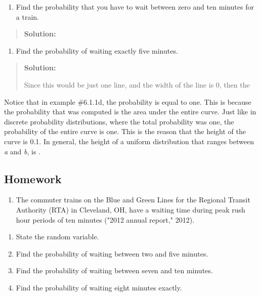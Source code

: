 \documentclass[]{book}
\providecommand{\tightlist}{%
  \setlength{\itemsep}{0pt}\setlength{\parskip}{0pt}}
\begin{document}
\begin{enumerate}
\def\labelenumi{\alph{enumi}.}
\setcounter{enumi}{3}
\tightlist
\item
  Find the probability that you have to wait between zero and ten
  minutes for a train.
\end{enumerate}

\begin{quote}
\textbf{Solution:}
\end{quote}

\begin{enumerate}
\def\labelenumi{\alph{enumi}.}
\setcounter{enumi}{4}
\tightlist
\item
  Find the probability of waiting exactly five minutes.
\end{enumerate}

\begin{quote}
\textbf{Solution:}

Since this would be just one line, and the width of the line is 0,
then the
\end{quote}

Notice that in example \#6.1.1d, the probability is equal to one. This
is because the probability that was computed is the area under the
entire curve. Just like in discrete probability distributions, where the
total probability was one, the probability of the entire curve is one.
This is the reason that the height of the curve is 0.1. In general, the
height of a uniform distribution that ranges between \emph{a} and \emph{b}, is .

\hypertarget{homework-16}{%
\subsection{Homework}\label{homework-16}}

\begin{enumerate}
\def\labelenumi{\arabic{enumi}.}
\tightlist
\item
  The commuter trains on the Blue and Green Lines for the Regional
  Transit Authority (RTA) in Cleveland, OH, have a waiting time during
  peak rush hour periods of ten minutes ("2012 annual report,"
  2012).
\end{enumerate}

\begin{enumerate}
\def\labelenumi{\alph{enumi}.}
\item
  State the random variable.
\item
  Find the probability of waiting between two and five minutes.
\item
  Find the probability of waiting between seven and ten minutes.
\item
  Find the probability of waiting eight minutes exactly.
\end{enumerate}
\end{document}
